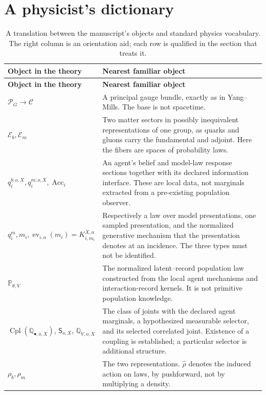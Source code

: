 \documentclass[11pt,letterpaper]{article}
\begin{document}
\section{A physicist's dictionary}

{\small
\begin{longtable}{>{\raggedright\arraybackslash}p{}>{\raggedright\arraybackslash}p{}}
\caption{A translation between the manuscript's objects and standard physics vocabulary. The right column is an orientation aid; each row is qualified in the section that treats it.}\label{tab:dictionary}\\
\toprule
\textbf{Object in the theory} & \textbf{Nearest familiar object} \\
\midrule
\endfirsthead
\toprule
\textbf{Object in the theory} & \textbf{Nearest familiar object} \\
\midrule
\endhead
\bottomrule
\endfoot
\bottomrule
\endlastfoot
\(\mathscr P_G\to\mathcal C\) & A principal gauge bundle, exactly as in Yang--Mills. The base is not spacetime. \\
\(\mathcal E_b,\mathcal E_m\) & Two matter sectors in possibly inequivalent representations of one group, as quarks and gluons carry the fundamental and adjoint. Here the fibers are spaces of probability laws. \\
\(q_i^{b;o,X},q_i^{m;o,X},\operatorname{Acc}_i\) & An agent's belief and model-law response sections together with its declared information interface. These are local data, not marginals extracted from a pre-existing population observer. \\
\(q_i^m,m_i,\operatorname{ev}_{i,a}(m_i)=K^{X,a}_{i,m_i}\) & Respectively a law over model presentations, one sampled presentation, and the normalized generative mechanism that the presentation denotes at an incidence. The three types must not be identified. \\
\(\mathbb P_{\theta,V}\) & The normalized latent--record population law constructed from the local agent mechanisms and interaction-record kernels. It is not primitive population knowledge. \\
\(\operatorname{Cpl}(\mathbb Q_{\bullet,o,X})\), \(\mathsf S_{o,X}\), \(\mathbb Q_{V,o,X}\) & The class of joints with the declared agent marginals, a hypothesized measurable selector, and its selected correlated joint. Existence of a coupling is established; a particular selector is additional structure. \\
\(\rho_b,\rho_m\) & The two representations. \(\widehat\rho\) denotes the induced action on laws, by pushforward, not by multiplying a density. \\

\end{longtable}}
\end{document}
